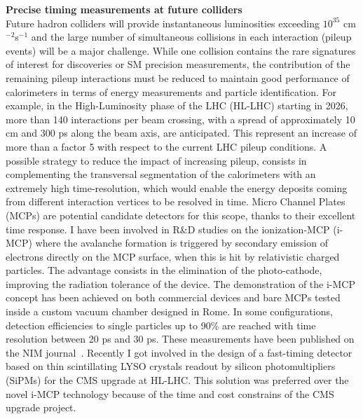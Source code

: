 \documentclass[10pt, a4paper]{article}
\begin{document}
{\bf Precise timing measurements at future colliders} \\[0.5em]
Future hadron colliders will provide instantaneous luminosities 
exceeding $10^{35}$ cm$^{-2}$s$^{-1}$ and the large number of 
simultaneous collisions in each interaction (pileup events) will be a
major challenge. While one collision contains the rare signatures of interest for discoveries 
or SM precision measurements, the contribution of the remaining
pileup interactions must be reduced to maintain good performance of
calorimeters in terms of energy measurements and particle
identification. For example, in the High-Luminosity phase of the LHC
(HL-LHC) starting in 2026, more than 140 interactions per beam crossing, with 
a spread of approximately 10 cm and 300 ps
along the beam axis, are anticipated. This represent an increase of
more than a factor 5 with respect to the current LHC pileup
conditions. A possible strategy to reduce the impact of
increasing pileup, consists in complementing the transversal segmentation of
the calorimeters with an extremely high time-resolution, 
which would enable the energy deposits coming from different 
interaction vertices to be resolved in time. Micro Channel Plates
(MCPs) are potential candidate detectors for this scope, thanks to their
excellent time response. I have been involved in R\&D studies on the
ionization-MCP (i-MCP) where the avalanche formation is triggered by secondary
emission of electrons directly on the MCP surface, when this is hit by
relativistic charged particles. The advantage consists in the elimination of the
photo-cathode, improving the radiation tolerance of the device.
The demonstration of the i-MCP concept has been achieved on both 
commercial devices and bare MCPs tested inside a custom vacuum 
chamber designed in Rome. In some configurations, detection
efficiencies to single particles up to 90\% are reached with time
resolution between 20 ps and 30 ps. These measurements have been 
published on the NIM journal~\cite{Brianza:2015jia,Barnyakov:2017twj}.
Recently I got involved in the design of a fast-timing detector
based on thin scintillating LYSO crystals readout by silicon
photomultipliers (SiPMs) for the CMS upgrade at HL-LHC. This solution was preferred over 
the novel i-MCP technology because of the time and
cost constrains of the CMS upgrade project. 


\end{document}
